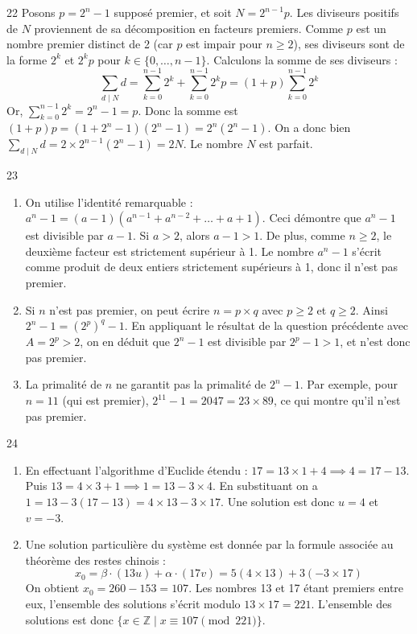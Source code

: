 \begin{correction}{22}
Posons $p = 2^n - 1$ supposé premier, et soit $N = 2^{n-1}p$.
Les diviseurs positifs de $N$ proviennent de sa décomposition en facteurs premiers. Comme $p$ est un nombre premier distinct de 2 (car $p$ est impair pour $n\ge2$), ses diviseurs sont de la forme $2^k$ et $2^k p$ pour $k \in \{0, \dots, n-1\}$.
Calculons la somme de ses diviseurs :
$$ \sum_{d \mid N} d = \sum_{k=0}^{n-1} 2^k + \sum_{k=0}^{n-1} 2^k p = (1+p) \sum_{k=0}^{n-1} 2^k $$
Or, $\sum_{k=0}^{n-1} 2^k = 2^n - 1 = p$.
Donc la somme est $(1+p)p = (1 + 2^n - 1)(2^n - 1) = 2^n (2^n - 1)$.
On a donc bien $\sum_{d \mid N} d = 2 \times 2^{n-1} (2^n - 1) = 2N$. Le nombre $N$ est parfait.
\end{correction}

\begin{correction}{23}
\begin{enumerate}
 \item[a)] On utilise l'identité remarquable : $a^n - 1 = (a-1)(a^{n-1} + a^{n-2} + \dots + a + 1)$. 
 Ceci démontre que $a^n-1$ est divisible par $a-1$. Si $a>2$, alors $a-1 > 1$. 
 De plus, comme $n \ge 2$, le deuxième facteur est strictement supérieur à 1. Le nombre $a^n-1$ s'écrit comme produit de deux entiers strictement supérieurs à 1, donc il n'est pas premier. 
 \item[b)] Si $n$ n'est pas premier, on peut écrire $n = p \times q$ avec $p \ge 2$ et $q \ge 2$. 
 Ainsi $2^n - 1 = (2^p)^q - 1$. 
 En appliquant le résultat de la question précédente avec $A = 2^p > 2$, on en déduit que $2^n - 1$ est divisible par $2^p - 1 > 1$, et n'est donc pas premier. 
 \item[c)] La primalité de $n$ ne garantit pas la primalité de $2^n-1$. Par exemple, pour $n=11$ (qui est premier), $2^{11}-1 = 2047 = 23 \times 89$, ce qui montre qu'il n'est pas premier. 
\end{enumerate}
\end{correction}

\begin{correction}{24}
\begin{enumerate}
 \item[a)] En effectuant l'algorithme d'Euclide étendu : $17 = 13 \times 1 + 4 \implies 4 = 17 - 13$. 
 Puis $13 = 4 \times 3 + 1 \implies 1 = 13 - 3 \times 4$. 
 En substituant on a $1 = 13 - 3(17 - 13) = 4 \times 13 - 3 \times 17$. 
 Une solution est donc $u = 4$ et $v = -3$. 
 \item[b)] Une solution particulière du système est donnée par la formule associée au théorème des restes chinois :
 $$ x_0 = \beta \cdot (13u) + \alpha \cdot (17v) = 5(4 \times 13) + 3(-3 \times 17) $$ 
 On obtient $x_0 = 260 - 153 = 107$. 
 Les nombres 13 et 17 étant premiers entre eux, l'ensemble des solutions s'écrit modulo $13 \times 17 = 221$. 
 L'ensemble des solutions est donc $\{x \in \mathbb{Z} \mid x \equiv 107 \pmod{221}\}$. 
\end{enumerate}
\end{correction}

